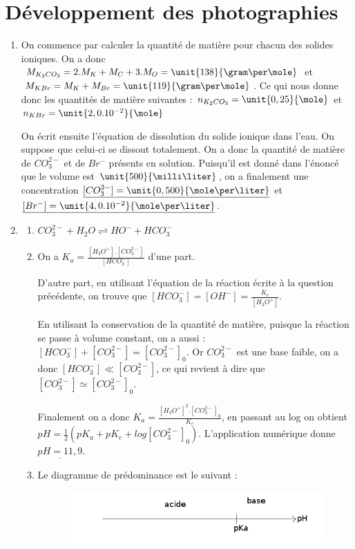 \documentclass[10pt,a4paper]{article}
\begin{document}
\section{Développement des photographies}
\begin{enumerate}
\item On commence par calculer la quantité de matière pour chacun des solides ioniques. On a donc $M_{K_2CO_3}=2.M_K+M_C+3.M_O=\unit{138}{\gram\per\mole}$ et
$M_{KBr}=M_K+M_{Br}= \unit{119}{\gram\per\mole}$. Ce qui nous donne donc les quantités de matière suivantes : $n_{K_2CO_3}=\unit{0,25}{\mole}$ et 
$n_{KBr}=\unit{2,0.10^{-2}}{\mole}$

On écrit ensuite l'équation de dissolution du solide ionique dans l'eau. On suppose que celui-ci se dissout totalement. On a donc la quantité de matière de
$CO_3^{2-}$ et de $Br^-$ présents en solution. Puisqu'il est donné dans l'énoncé que le volume est $\unit{500}{\milli\liter}$, on a finalement une concentration
$\underline{[CO_3^{2-}]=\unit{0,500}{\mole\per\liter}}$ et $\underline{[Br^-]=\unit{4,0.10^{-2}}{\mole\per\liter}}$.
\item 
\begin{enumerate}
\item $CO_3^{2-}+H_2O\rightleftharpoons HO^-+HCO_3^-$
\item On a $K_a=\frac{[H_3O^+].[CO_3^{2-}]}{[HCO_3^-]}$ d'une part. 

D'autre part, en utilisant l'équation de la réaction écrite à la question précédente, on trouve que $[HCO_3^-]=[OH^-]=\frac{K_e}{[H_3O^+]}$.

En utilisant la conservation de la quantité de matière, puisque la réaction se passe à volume constant, on a aussi : $[HCO_3^-]+[CO_3^{2-}]=[CO_3^{2-}]_0$.
Or $CO_3^{2-}$ est une base faible, on a donc $[HCO_3^-]\ll [CO_3^{2-}]$, ce qui revient à dire que $[CO_3^{2-}]\simeq [CO_3^{2-}]_0$.

Finalement on a donc $K_a=\frac{[H_3O^+]^2.[CO_3^{2-}]_0}{K_e}$, en passant au log on obtient $\boxed{pH=\frac{1}{2}(pK_a+pK_e+log[CO_3^{2-}]_0)}$.
L'application numérique donne $\underline{pH=11,9}$.
\item Le diagramme de prédominance est le suivant :
\begin{figure}[h!]
\center
\includegraphics[scale=2]{echelle_pH.png}
\end{figure}


\end{enumerate}
\end{enumerate}
\end{document}
